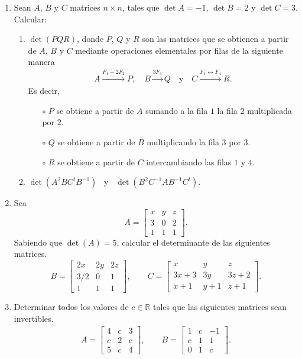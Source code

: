 \documentclass[a4paper,12pt,twoside,spanish,reqno]{amsbook}
\numberwithin{equation}{section}
\begin{document}
\begin{enumerate}[topsep=6pt,itemsep=.4cm]
\item Sean $A$, $B$ y $C$ matrices $n\times n$, tales que $\det A=-1$, $\det B=2$ y $\det C=3$.
Calcular:

\begin{enumerate}
\item $\det(PQR)$, donde $P$, $Q$ y $R$ son las matrices que se obtienen a partir de $A$, $B$ y $C$ mediante operaciones elementales por filas de la siguiente manera
 \begin{align*}
 A\overset{F_1+2F_2}{\longrightarrow} P,\quad
 B\overset{3F_3}{\longrightarrow} Q
 \quad\mbox{y}\quad
 C\overset{F_1\leftrightarrow F_4}{\longrightarrow} R.
 \end{align*}
 Es decir,
 \begin{itemize}
  \item[$\circ$] $P$ se obtiene a partir de $A$ sumando a la fila $1$ la fila $2$ multiplicada por $2$.
  \item[$\circ$] $Q$ se obtiene a partir de $B$ multiplicando la fila $3$ por $3$.
  \item[$\circ$] $R$ se obtiene a partir de $C$ intercambiando las filas $1$ y $4$.
 \end{itemize}
	\item $\det(A^2BC^tB^{-1})$ \ y \ $\det(B^2C^{-1}AB^{-1}C^{t})$.
\end{enumerate}


\item  Sea
$$A=
\begin{bmatrix}
	x&y&z \\
	3&0&2\\
	1&1&1
\end{bmatrix}.$$
Sabiendo que $\det(A) = 5$, calcular el determinante de las siguientes matrices.
$$
B = \begin{bmatrix}
2x&2y&2z \\
3/2&0&1\\
1&1&1
\end{bmatrix}, \qquad
C=
\begin{bmatrix}
	x&y&z \\
	3x+3&3y&3z+2\\
	x+1&y+1&z+1
\end{bmatrix}.
$$


\item Determinar todos los valores de $c\in\mathbb{R}$ tales que las siguientes matrices sean invertibles.
\begin{align*}
A=\begin{bmatrix}4& c&3\\c&2&c\\ 5&c&4 \end{bmatrix},\qquad
B=\begin{bmatrix} 1&c&-1\\ c&1&1\\0&1&c\end{bmatrix}.
\end{align*}



\end{enumerate}
\end{document}
